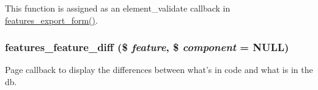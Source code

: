 This function is assigned as an element\_\-validate callback in \hyperlink{features_8admin_8inc_ac6d72d74ab676748b1197536446c1063}{features\_\-export\_\-form()}. \hypertarget{features_8admin_8inc_a4865491ed8883d5be90311f3248bb785}{
\subsubsection[{features\_\-feature\_\-diff}]{\setlength{\rightskip}{0pt plus 5cm}features\_\-feature\_\-diff (\$ {\em feature}, \/  \$ {\em component} = {\ttfamily NULL})}}
\label{features_8admin_8inc_a4865491ed8883d5be90311f3248bb785}
Page callback to display the differences between what's in code and what is in the db.


